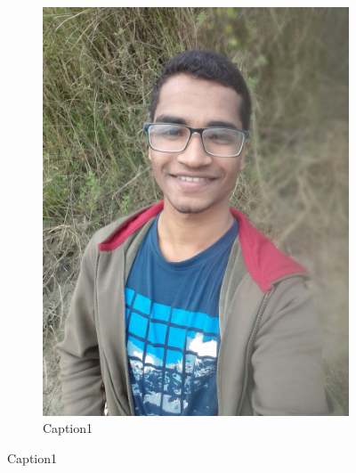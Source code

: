 \documentclass[a4paper, 12pt]{report}
\begin{document}
\begin{figure}[h]

\begin{subfigure}{0.4\textwidth}
\includegraphics[width=\textwidth]{Jakir}
\caption{Caption1}
\label{fig:subimage1}
\end{subfigure}


\end{figure}
\end{document}
